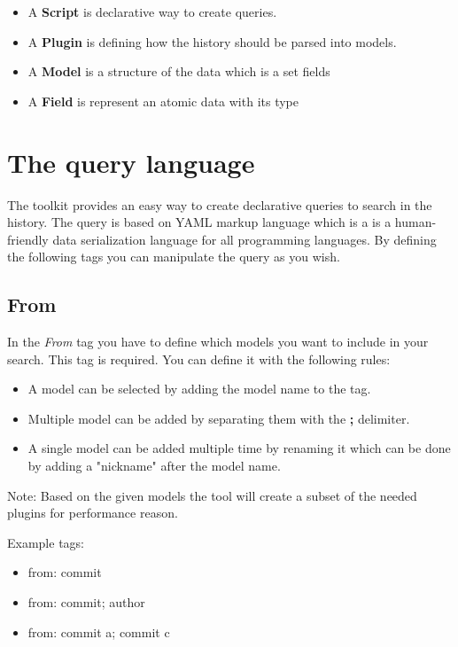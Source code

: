 \begin{itemize}
   \item A \textbf{Script} is declarative way to create queries.
   \item A \textbf{Plugin} is defining how the history should be parsed into models.
   \item A \textbf{Model} is a structure of the data which is a set fields
   \item A \textbf{Field} is represent an atomic data with its type
\end{itemize}

\section{The query language}

The toolkit provides an easy way to create declarative queries to search in the history.
The query is based on YAML\cite{yaml} markup language which is a is a human-friendly data serialization language for all programming languages. 
By defining the following tags you can manipulate the query as you wish.


\subsection{From}

In the \textit{From} tag you have to define which models you want to include in your search.
This tag is required.
You can define it with the following rules:

\begin{itemize}
	\item A model can be selected by adding the model name to the tag.
	\item Multiple model can be added by separating them with the \textbf{;} delimiter.
	\item A single model can be added multiple time by renaming it which can be done by adding a "nickname" after the model name.
\end{itemize}

Note: Based on the given models the tool will create a subset of the needed plugins for performance reason.

Example tags:
\begin{itemize}
	\item from: commit
	\item from: commit; author
	\item from: commit a; commit c
\end{itemize}

